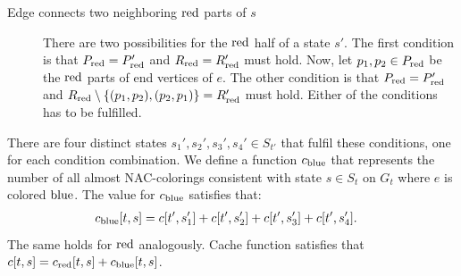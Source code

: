 \begin{lemma}
\begin{description}
		\item[Edge connects two neighboring \( \text{red} \) parts of \( s \)]
		      There are two possibilities for the \( \text{red} \) half of a state \( s' \).
		      The first condition is that \( P_{\text{red}} = P_{\text{red}}' \)
		      and \( R_{\text{red}} = R_{\text{red}}' \) must hold.
		      Now, let \( p_1, p_2 \in P_{\text{red}} \) be the \( \text{red} \) parts
		      of end vertices of \( e \).
		      The other condition is that \( P_{\text{red}} = P_{\text{red}}' \) and
		      \( R_{\text{red}} \setminus \{(p_{1}, p_{2}), (p_{2}, p_{1})\} = R_{\text{red}}' \) must hold.
		      Either of the conditions has to be fulfilled.

	\end{description}
	There are four distinct states \( s_1', s_2', s_3', s_4' \in S_{t'} \)
	that fulfil these conditions, one for each condition combination.
	We define a function \( c_{\text{blue}} \) that represents
	the number of all almost NAC-colorings
	consistent with state \( s \in S_t \) on \( G_t \)
	where \( e \) is colored \( \text{blue} \).
	The value for \( c_{\text{blue}} \) satisfies that:
	\begin{align*}
		c_{\text{blue}}[t, s] & = c[t', s_1'] + c[t', s_2'] + c[t', s_3'] + c[t', s_4'].
	\end{align*}
	The same holds for \( \text{red} \) analogously.
	Cache function satisfies that  \( c[t, s] = c_{\text{red}}[t, s] + c_{\text{blue}}[t, s] \).
\end{lemma}
%
